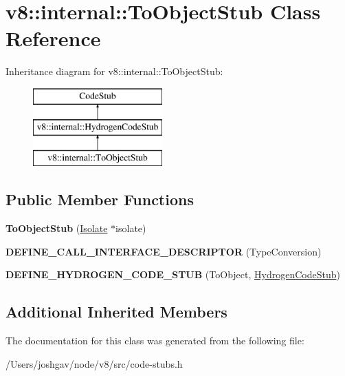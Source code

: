 \hypertarget{classv8_1_1internal_1_1_to_object_stub}{}\section{v8\+:\+:internal\+:\+:To\+Object\+Stub Class Reference}
\label{classv8_1_1internal_1_1_to_object_stub}
Inheritance diagram for v8\+:\+:internal\+:\+:To\+Object\+Stub\+:\begin{figure}[H]
\begin{center}
\leavevmode
\includegraphics[height=3.000000cm]{classv8_1_1internal_1_1_to_object_stub}
\end{center}
\end{figure}
\subsection*{Public Member Functions}
\begin{DoxyCompactItemize}
\item 
{\bfseries To\+Object\+Stub} (\hyperlink{classv8_1_1internal_1_1_isolate}{Isolate} $\ast$isolate)\hypertarget{classv8_1_1internal_1_1_to_object_stub_a92a95f1c8dda8888ff68d01f913ea879}{}\label{classv8_1_1internal_1_1_to_object_stub_a92a95f1c8dda8888ff68d01f913ea879}

\item 
{\bfseries D\+E\+F\+I\+N\+E\+\_\+\+C\+A\+L\+L\+\_\+\+I\+N\+T\+E\+R\+F\+A\+C\+E\+\_\+\+D\+E\+S\+C\+R\+I\+P\+T\+OR} (Type\+Conversion)\hypertarget{classv8_1_1internal_1_1_to_object_stub_a8ecce5f10b98cb1227d3b59c004bc209}{}\label{classv8_1_1internal_1_1_to_object_stub_a8ecce5f10b98cb1227d3b59c004bc209}

\item 
{\bfseries D\+E\+F\+I\+N\+E\+\_\+\+H\+Y\+D\+R\+O\+G\+E\+N\+\_\+\+C\+O\+D\+E\+\_\+\+S\+T\+UB} (To\+Object, \hyperlink{classv8_1_1internal_1_1_hydrogen_code_stub}{Hydrogen\+Code\+Stub})\hypertarget{classv8_1_1internal_1_1_to_object_stub_ac340f5a139eb6efb6a7bd0df6006d688}{}\label{classv8_1_1internal_1_1_to_object_stub_ac340f5a139eb6efb6a7bd0df6006d688}

\end{DoxyCompactItemize}
\subsection*{Additional Inherited Members}


The documentation for this class was generated from the following file\+:\begin{DoxyCompactItemize}
\item 
/\+Users/joshgav/node/v8/src/code-\/stubs.\+h\end{DoxyCompactItemize}
